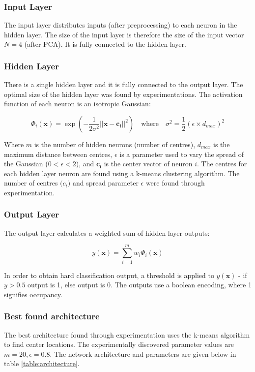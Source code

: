 \documentclass[a4paper, 11pt]{article}
\begin{document}
\subsubsection{Input Layer}
The input layer distributes inputs (after preprocessing) to each neuron in the hidden layer. The size of the input layer is therefore the size of the input vector $N=4$ (after PCA). It is fully connected to the hidden layer.

\subsubsection{Hidden Layer}
There is a single hidden layer and it is fully connected to the output layer. The optimal size of the hidden layer was found by experimentations. The activation function of each neuron is an isotropic Gaussian:

\begin{equation}
\Phi_i(\boldsymbol{x}) = \exp\left(-\frac{1}{2\sigma^2} \lvert\lvert \boldsymbol{x} -  \boldsymbol{c_i} \rvert\rvert ^2\right)
\quad \mathrm{where }\quad
\sigma^2 = \frac{1}{2}(\epsilon \times d_{max})^2
\label{eq:rbf}
\end{equation}


Where $m$ is the number of hidden neurons (number of centres), $d_{max}$ is the maximum distance between centres, $\epsilon$ is a parameter used to vary the spread of the Gaussian ($0<\epsilon<2$), and $\boldsymbol{c_i}$ is the center vector of neuron $i$. The centres for each hidden layer neuron are found using a k-means clustering algorithm. The number of centres $\boldsymbol(c_i)$ and spread parameter $\epsilon$ were found through experimentation.

\subsubsection{Output Layer}
The output layer calculates a weighted sum of hidden layer outputs:

\begin{equation}
y(\boldsymbol{x}) = \displaystyle\sum_{i=1}^{m} w_i \Phi_i(\boldsymbol{x})
\end{equation}


In order to obtain hard classification output, a threshold is applied to $y(\boldsymbol{x})$ - if $y>0.5$ output is 1, else output is 0. The outputs use a boolean encoding, where 1 signifies occupancy.

\subsubsection{Best found architecture}
The best architecture found through experimentation uses the k-means algorithm to find center locations. The experimentally discovered parameter values are $m = 20, \epsilon = 0.8$. The network architecture and parameters are given below in table \ref{table:architecture}.
\end{document}
